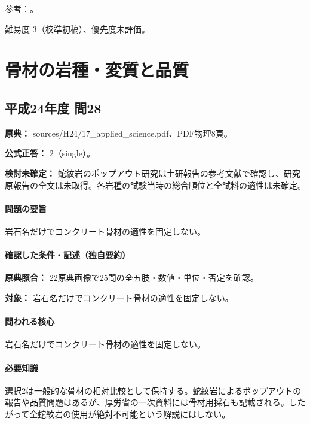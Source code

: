\par 参考：\cite{jseg_engineering_faq,kyoto_deep2018,sabo_deep2014,jsce_swelling2010,aist_accretion2026}。

\par 難易度 3（校準初稿）、優先度未評価。

\section{骨材の岩種・変質と品質}

\subsection{平成24年度 問28}
\label{q:h24-reg-applied-28}

\noindent\textbf{原典：} sources/H24/17\_applied\_science.pdf、PDF物理8頁。

\textbf{公式正答：} 2（single）。

\par\textbf{検討未確定：} 蛇紋岩のポップアウト研究は土研報告の参考文献で確認し、研究原報告の全文は未取得。各岩種の試験当時の総合順位と全試料の適性は未確定。

\paragraph{問題の要旨} 岩石名だけでコンクリート骨材の適性を固定しない。

\paragraph{確認した条件・記述（独自要約）}\mbox{}\par

\noindent\textbf{原典照合：} 22原典画像で25問の全五肢・数値・単位・否定を確認。\par

\noindent\textbf{対象：} 岩石名だけでコンクリート骨材の適性を固定しない。\par

\paragraph{問われる核心} 岩石名だけでコンクリート骨材の適性を固定しない。

\paragraph{必要知識} 選択2は一般的な骨材の相対比較として保持する。蛇紋岩によるポップアウトの報告や品質問題はあるが、厚労省の一次資料には骨材用採石も記載される。したがって全蛇紋岩の使用が絶対不可能という解説にはしない。

